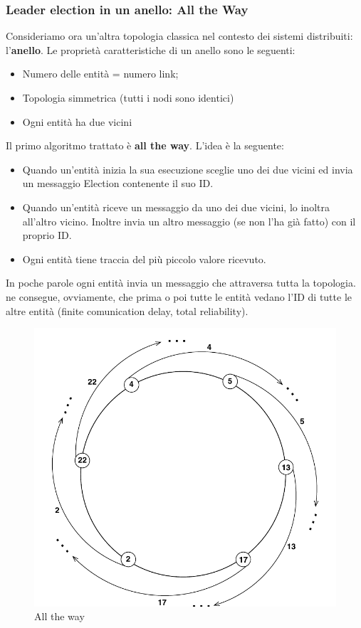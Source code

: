\documentclass[12pt]{article}
\begin{document}
		\subsubsection{Leader election in un anello: All the Way}
			Consideriamo ora un'altra topologia classica nel contesto dei sistemi distribuiti: l'\textbf{anello}. Le proprietà caratteristiche di un anello sono le seguenti:
			\begin{itemize}
				\item Numero delle entità = numero link;
				\item Topologia simmetrica (tutti i nodi sono identici)
				\item Ogni entità ha due vicini
			\end{itemize}
			Il primo algoritmo trattato è \textbf{all the way}. L'idea è la seguente:
			\begin{itemize}
				\item Quando un'entità inizia la sua esecuzione sceglie uno dei due vicini ed invia un messaggio Election contenente il suo ID.
				\item Quando un'entità riceve un messaggio da uno dei due vicini, lo inoltra all'altro vicino. Inoltre invia un altro messaggio (se non l'ha già fatto) con il proprio ID.
				\item Ogni entità tiene traccia del più piccolo valore ricevuto.
			\end{itemize}
			In poche parole ogni entità invia un messaggio che attraversa tutta la topologia. ne consegue, ovviamente, che prima o poi tutte le entità vedano l'ID di tutte le altre entità (finite comunication delay, total reliability).
			\begin{figure}[h!]
				\centering
				\includegraphics[scale=0.25]{img/ring2.png}
				\caption{All the way}
			\end{figure}
\end{document}
